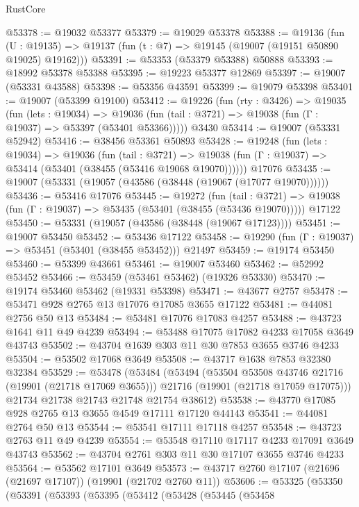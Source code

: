 \begin{lexlean}{RustCore}
\begin{coremodule}
@53378 := @19032 @53377
@53379 := @19029 @53378
@53388 := @19136
    (fun (U : @19135) => @19137 (fun (t : @7) => @19145 (@19007 (@19151 @50890 @19025) @19162)))
@53391 := @53353 (@53379 @53388) @50888
@53393 := @18992 @53378 @53388
@53395 := @19223 @53377 @12869
@53397 := @19007 (@53331 @43588)
@53398 := @53356 @43591
@53399 := @19079 @53398
@53401 := @19007 (@53399 @19100)
@53412 := @19226
    (fun (rty : @3426) =>
    @19035
      (fun (lets : @19034) =>
      @19036 (fun (tail : @3721) => @19038 (fun (Γ : @19037) => @53397 (@53401 @53366)))))
    @3430
@53414 := @19007 (@53331 @52942)
@53416 := @38456 @53361 @50893
@53428 := @19248
    (fun (lets : @19034) =>
    @19036
      (fun (tail : @3721) =>
      @19038 (fun (Γ : @19037) => @53414 (@53401 (@38455 (@53416 @19068 @19070))))))
    @17076
@53435 := @19007 (@53331 (@19057 (@43586 (@38448 (@19067 (@17077 @19070))))))
@53436 := @53416 @17076
@53445 := @19272
    (fun (tail : @3721) => @19038 (fun (Γ : @19037) => @53435 (@53401 (@38455 (@53436 @19070)))))
    @17122
@53450 := @53331 (@19057 (@43586 (@38448 (@19067 @17123))))
@53451 := @19007 @53450
@53452 := @53436 @17122
@53458 := @19290 (fun (Γ : @19037) => @53451 (@53401 (@38455 @53452))) @21497
@53459 := @19174 @53450
@53460 := @53399 @43661
@53461 := @19007 @53460
@53462 := @52992 @53452
@53466 := @53459 (@53461 @53462) (@19326 @53330)
@53470 := @19174 @53460 @53462 (@19331 @53398)
@53471 := @43677 @2757
@53478 := @53471 @928 @2765 @13 @17076 @17085 @3655 @17122
@53481 := @44081 @2756 @50 @13
@53484 := @53481 @17076 @17083 @4257
@53488 := @43723 @1641 @11 @49 @4239
@53494 := @53488 @17075 @17082 @4233 @17058 @3649 @43743
@53502 := @43704 @1639 @303 @11 @30 @7853 @3655 @3746 @4233
@53504 := @53502 @17068 @3649
@53508 := @43717 @1638 @7853 @32380 @32384
@53529 := @53478
    (@53484
      (@53494
        (@53504 @53508 @43746 @21716 (@19901 (@21718 @17069 @3655)))
        @21716
        (@19901 (@21718 @17059 @17075)))
      @21734
      @21738
      @21743
      @21748
      @21754
      @38612)
@53538 := @43770 @17085 @928 @2765 @13 @3655 @4549 @17111 @17120 @44143
@53541 := @44081 @2764 @50 @13
@53544 := @53541 @17111 @17118 @4257
@53548 := @43723 @2763 @11 @49 @4239
@53554 := @53548 @17110 @17117 @4233 @17091 @3649 @43743
@53562 := @43704 @2761 @303 @11 @30 @17107 @3655 @3746 @4233
@53564 := @53562 @17101 @3649
@53573 := @43717 @2760 @17107 (@21696 (@21697 @17107)) (@19901 (@21702 @2760 @11))
@53606 := @53325
    (@53350
      (@53391
        (@53393
          (@53395
            (@53412
              (@53428
                (@53445
                  (@53458

\end{coremodule}
\end{lexlean}
